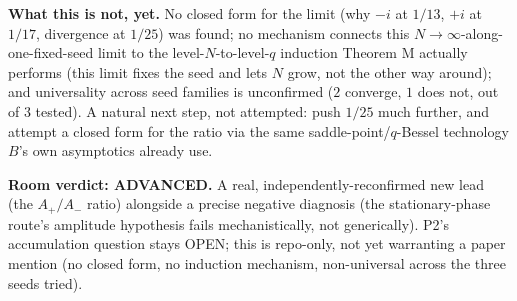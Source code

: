 \documentclass[11pt]{article}
\theoremstyle{remark}\newtheorem{remark}[theorem]{Remark}
\begin{document}
\textbf{What this is not, yet.} No closed form for the limit (why $-i$ at $1/13$, $+i$ at $1/17$,
divergence at $1/25$) was found; no mechanism connects this $N\to\infty$-along-one-fixed-seed limit
to the level-$N$-to-level-$q$ induction Theorem M actually performs (this limit fixes the seed and
lets $N$ grow, not the other way around); and universality across seed families is unconfirmed
($2$ converge, $1$ does not, out of $3$ tested). A natural next step, not attempted: push $1/25$
much further, and attempt a closed form for the ratio via the same saddle-point/$q$-Bessel
technology $B$'s own asymptotics already use.

\textbf{Room verdict: ADVANCED.} A real, independently-reconfirmed new lead (the $A_+/A_-$ ratio)
alongside a precise negative diagnosis (the stationary-phase route's amplitude hypothesis fails
mechanistically, not generically). P2's accumulation question stays OPEN; this is repo-only, not
yet warranting a paper mention (no closed form, no induction mechanism, non-universal across the
three seeds tried).
\end{document}
